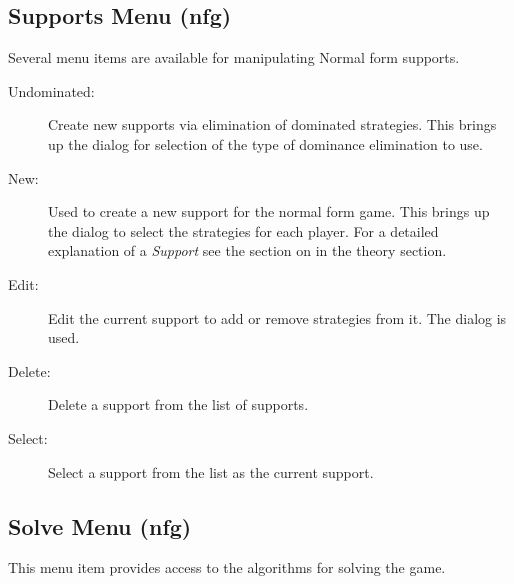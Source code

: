 \documentclass[12pt]{report}
\begin{document}
\subsection{Supports Menu (nfg)}\label{nfsupports}

Several menu items are available for manipulating Normal form supports.  

\begin{description}
\item[Undominated:] Create new supports via elimination of dominated
strategies.  This brings up the  dialog for selection of the type of
dominance elimination to use.
\item[New:] Used to create a new support for the normal form game.
This brings up the  dialog to select
the strategies for each player.  For a detailed explanation of a {\em
Support} see the section on  in the
theory section.
\item[Edit:] Edit the current support to add or remove strategies from
it. The  dialog is used.  
\item[Delete:] Delete a support from the list of supports.   
\item[Select:] Select a support from the list as the current support.  
\end{description}

\subsection{Solve Menu (nfg)}\label{nfsolve}

This menu item provides access to the algorithms for solving the game. 
\end{document}

